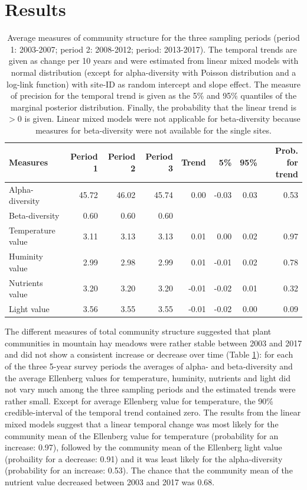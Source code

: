 \documentclass[fleqn,10pt,lineno]{wlpeerj} %
\theoremstyle{definition}
\theoremstyle{definition}
\theoremstyle{definition}
\theoremstyle{remark}
\begin{document}
\section*{Results}\label{results}

\begin{table}

\caption{\label{tab:communitytrends}Average measures of community structure for the three sampling periods (period 1: 2003-2007; period 2: 2008-2012; period: 2013-2017). The temporal trends are given as  change per 10 years and were estimated from linear mixed models with normal distribution (except for alpha-diversity with Poisson distribution and a log-link function) with site-ID as random intercept and slope effect. The measure of precision for the temporal trend is given as the 5\% and 95\% quantiles of the marginal posterior distribution. Finally, the probability that the linear trend is $> 0$ is given. Linear mixed models were not applicable for beta-diversity because measures for beta-diversity were not available for the single sites.}
\centering
\begin{tabular}[t]{lrrrrrrr}
\toprule
Measures & Period 1 & Period 2 & Period 3 & Trend & 5\% & 95\% & Prob. for trend\\
\midrule
Alpha-diversity & 45.72 & 46.02 & 45.74 & 0.00 & -0.03 & 0.03 & 0.53\\
Beta-diversity & 0.60 & 0.60 & 0.60 &  &  &  & \\
Temperature value & 3.11 & 3.13 & 3.13 & 0.01 & 0.00 & 0.02 & 0.97\\
Huminity value & 2.99 & 2.98 & 2.99 & 0.01 & -0.01 & 0.02 & 0.78\\
Nutrients value & 3.20 & 3.20 & 3.20 & -0.01 & -0.02 & 0.01 & 0.32\\
Light value & 3.56 & 3.55 & 3.55 & -0.01 & -0.02 & 0.00 & 0.09\\
\bottomrule
\end{tabular}
\end{table}

The different measures of total community structure suggested that plant
communities in mountain hay meadows were rather stable between 2003 and
2017 and did not show a consistent increase or decrease over time (Table
\ref{tab:communitytrends}): for each of the three 5-year survey periods
the averages of alpha- and beta-diversity and the average Ellenberg
values for temperature, huminity, nutrients and light did not vary much
among the three sampling periods and the estimated trends were rather
small. Except for average Ellenberg value for temperature, the 90\%
credible-interval of the temporal trend contained zero. The results from
the linear mixed models suggest that a linear temporal change was most
likely for the community mean of the Ellenberg value for temperature
(probability for an increase: 0.97), followed by the community mean of
the Ellenberg light value (probaility for a decrease: 0.91) and it was
least likely for the alpha-diversity (probability for an increase:
0.53). The chance that the community mean of the nutrient value
decreased between 2003 and 2017 was 0.68.
\end{document}
